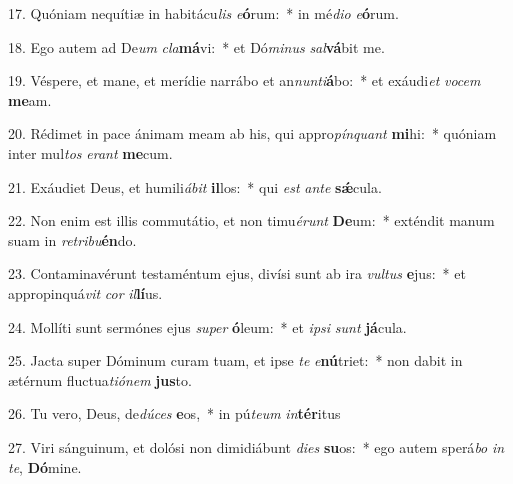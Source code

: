 17. Quóniam nequítiæ in habitácu\textit{lis} \textit{e}\textbf{ó}rum:~*  in mé\textit{di}\textit{o} \textit{e}\textbf{ó}rum.\

18. Ego autem ad De\textit{um} \textit{cla}\textbf{má}vi:~*  et Dó\textit{mi}\textit{nus} \textit{sal}\textbf{vá}bit me.\

19. Véspere, et mane, et merídie narrábo et an\textit{nun}\textit{ti}\textbf{á}bo:~*  et exáudi\textit{et} \textit{vo}\textit{cem} \textbf{me}am.\

20. Rédimet in pace ánimam meam ab his, qui appro\textit{pín}\textit{quant} \textbf{mi}hi:~*  quóniam inter mul\textit{tos} \textit{e}\textit{rant} \textbf{me}cum.\

21. Exáudiet Deus, et humili\textit{á}\textit{bit} \textbf{il}los:~*  qui \textit{est} \textit{an}\textit{te} \textbf{sǽ}cula.\

22. Non enim est illis commutátio, et non timu\textit{é}\textit{runt} \textbf{De}um:~*  exténdit manum suam in \textit{re}\textit{tri}\textit{bu}\textbf{én}do.\

23. Contaminavérunt testaméntum ejus, divísi sunt ab ira \textit{vul}\textit{tus} \textbf{e}jus:~*  et appropinquá\textit{vit} \textit{cor} \textit{il}\textbf{lí}us.\

24. Mollíti sunt sermónes ejus \textit{su}\textit{per} \textbf{ó}leum:~*  et \textit{ip}\textit{si} \textit{sunt} \textbf{já}cula.\

25. Jacta super Dóminum curam tuam, et ipse \textit{te} \textit{e}\textbf{nú}triet:~*  non dabit in ætérnum fluctua\textit{ti}\textit{ó}\textit{nem} \textbf{jus}to.\

26. Tu vero, Deus, de\textit{dú}\textit{ces} \textbf{e}os,~*  in pú\textit{te}\textit{um} \textit{in}\textbf{tér}itus\

27. Viri sánguinum, et dolósi non dimidiábunt \textit{di}\textit{es} \textbf{su}os:~*  ego autem sperá\textit{bo} \textit{in} \textit{te}, \textbf{Dó}mine.\

